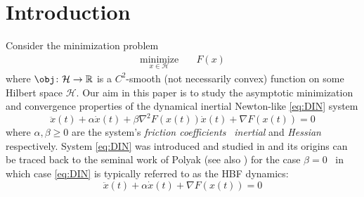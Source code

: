 \documentclass[reqno]{amsart}
\theoremstyle{plain}
\theoremstyle{definition}
\theoremstyle{remark}
\newcommand{\draft}[1]{{\color{MacroColor}#1}}	%
\newcommand{\R}{\mathbb{R}}	%
\DeclareMathOperator{\Hess}{\nabla^{2}}	%
\renewcommand{\time}{\draft{t}}	%
\newcommand{\posof}[2][]{\pos_{#1}(#2)}	%
\newcommand{\velof}[2][]{\dot\pos_{#1}(#2)}	%
\newcommand{\accof}[2][]{\ddot\pos_{#1}(#2)}	%
\newcommand{\from}{\colon}	%
\newcommand{\Hb}{\mathcal{H}}
\begin{document}
\section{Introduction}
\label{sec:introduction}


Consider the  minimization problem
\begin{equation}
\label{eq:opt}
\tag{Opt}
\begin{aligned}
\operatorname*{minimize}_{x\in\Hb}
	&\quad
	F(x)
\end{aligned}
\end{equation}
where $\obj\from\Hb\to\R$ is a $C^{2}$-smooth (not necessarily convex) function on some Hilbert space $\Hb$.
Our aim in this paper is to study the asymptotic minimization and convergence properties of the dynamical inertial Newton-like \eqref{eq:DIN} system
\begin{equation}
\label{eq:DIN}
\tag{DIN}
    \ddot{x}(t) +\alpha\dot{x}(t) +\beta\nabla^{2}F(x(t))\dot{x}(t) +\nabla F(x(t)) =0 
\end{equation}
where
$\alpha,\beta\geq0$ are the system's \emph{friction coefficients} \textendash\ \emph{inertial} and \emph{Hessian} respectively. System \eqref{eq:DIN} was introduced and studied in \cite{alvarez2002second} and its origins can be traced back to the seminal work of Polyak \cite{polyak1964some} (see also \cite{antipin1994minimization,alvarez2000minimizing,attouch2000heavy}) for the case $\beta = 0$ \textendash\ in which case \eqref{eq:DIN} is typically referred to as the \acf{HBF} dynamics:
\begin{equation}\label{HBode}\tag{HBF}
	\ddot{x}(t)+\alpha\dot{x}(t)+\nabla F(x(t)) = 0
\end{equation}
\end{document}
